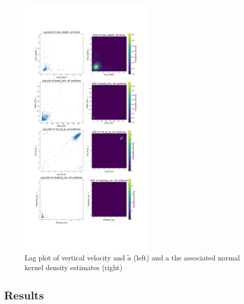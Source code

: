 \begin{figure}[h!]
	\centering
	\includegraphics[height=5in]{../Plots/lagplot.png}
	\caption{Lag plot of vertical velocity and $\tilde a$ (left) and a the associated normal kernel density estimates (right)}
	\label{fig:lag}
\end{figure}

\subsection{Results}

